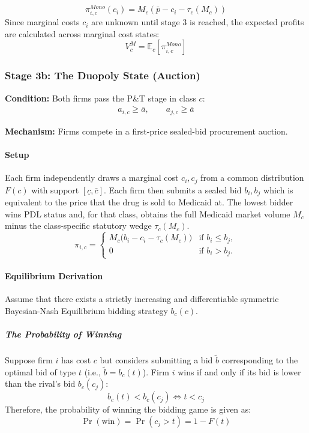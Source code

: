 \documentclass[12pt]{article}
\begin{document}
\begin{equation} \label{eq:mono_profit}
    \pi_{i,c}^{Mono}(c_i) = M_c(\bar{p} - c_i - \tau_c(M_c))
\end{equation}
Since marginal costs $c_i$ are unknown until stage 3 is reached, the expected profits are calculated across marginal cost states:
\begin{equation}
V_c^M = \mathbb{E}_c[\pi_{i,c}^{Mono}]
\end{equation}

\subsubsection{Stage 3b: The Duopoly State (Auction)}
\textbf{Condition:} Both firms pass the P\&T stage in class $c$:
\begin{align*}
    a_{i,c} \geq \bar{a}, \qquad a_{j,c} \geq \bar{a}
\end{align*}

\textbf{Mechanism:} Firms compete in a first-price sealed-bid procurement auction.

\paragraph{Setup}
Each firm independently draws a marginal cost $c_i, c_j$ from a common distribution $F(c)$ with support $[\underline{c}, \bar{c}]$. Each firm then submits a sealed bid $b_i, b_j$ which is equivalent to the price that the drug is sold to Medicaid at. The lowest bidder wins PDL status and, for that class, obtains the full Medicaid market volume $M_c$ minus the class-specific statutory wedge $\tau_c(M_c)$.
\[
\pi_{i,c} =
\begin{cases}
M_c\big(b_i - c_i - \tau_c(M_c)\big) & \text{if } b_i \leq b_j, \\
0 & \text{if } b_i > b_j.
\end{cases}
\]

\paragraph{Equilibrium Derivation}
Assume that there exists a strictly increasing and differentiable symmetric Bayesian-Nash Equilibrium bidding strategy $b_c(c)$.

\subparagraph{The Probability of Winning}
Suppose firm $i$ has cost $c$ but considers submitting a bid $\tilde{b}$ corresponding to the optimal bid of type $t$ (i.e., $\tilde{b} = b_c(t)$). Firm $i$ wins if and only if its bid is lower than the rival's bid $b_c(c_j)$:
\begin{equation}
    b_c(t) < b_c(c_j) \iff t < c_j
\end{equation}
Therefore, the probability of winning the bidding game is given as:
\begin{equation}
    \Pr(\text{win}) = \Pr(c_j > t) = 1 - F(t)
\end{equation}
\end{document}
